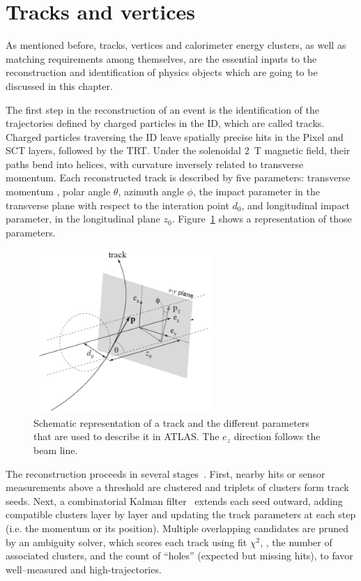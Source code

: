 \section{Tracks and vertices}
\label{sec:tracks}

As mentioned before, tracks, vertices and calorimeter energy clusters, as well as matching requirements among themselves, are the essential inputs to the reconstruction and identification of physics objects which are going to be discussed in this chapter.

The first step in the reconstruction of an event is the identification of the trajectories defined by charged particles in the ID, which are called tracks.
Charged particles traversing the ID leave spatially precise hits in the Pixel and SCT layers, followed by the TRT. Under the solenoidal 2~T magnetic field, their paths bend into helices, with curvature inversely related to transverse momentum. 
Each reconstructed track is described by five parameters: transverse momentum \pt, polar angle \(\theta\), azimuth angle \(\phi\), the impact parameter in the transverse plane with respect to the interation point \(d_0\), and longitudinal impact parameter, in the longitudinal plane \(z_0\). Figure~\ref{fig:tracks} shows a representation of those parameters.

\begin{figure}[htbp]
  \centering
  \includegraphics[width=0.6\textwidth]{images/tracks.png}
  \caption{Schematic representation of a track and the different parameters that are used to describe it in ATLAS. The $e_z$ direction follows the beam line\cite{Bianchi:2837191}.}
  \label{fig:tracks}
 \end{figure}

The reconstruction proceeds in several stages~\cite{tracks}. First, nearby hits or sensor measurements above a threshold are clustered and triplets of clusters form track seeds. Next, a combinatorial Kalman filter~\cite{kalman} extends each seed outward, adding compatible clusters layer by layer and updating the track parameters at each step (i.e. the momentum or its position). Multiple overlapping candidates are pruned by an ambiguity solver, which scores each track using fit \(\chi^2\), \pt, the number of associated clusters, and the count of “holes” (expected but missing hits), to favor well–measured and high-\pt trajectories.

